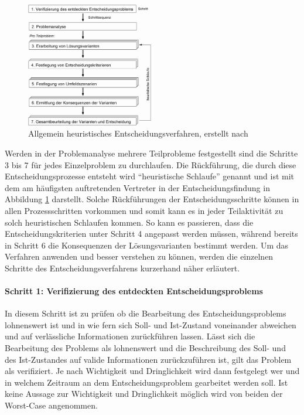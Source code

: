 \begin{figure}[h!]
	\centering
	\includegraphics[width=0.5\textwidth]{img/heuristik}
	\caption{Allgemein heuristisches Entscheidungsverfahren, erstellt nach \cite{Grunig.2013}}
	\label{fig:ahev}
\end{figure}
\FloatBarrier

Werden in der Problemanalyse mehrere Teilprobleme festgestellt sind die Schritte\,3 bis 7 für jedes Einzelproblem zu durchlaufen. Die Rückführung, die durch diese Entscheidungsprozesse entsteht wird "`heuristische Schlaufe"' genannt und ist mit dem am häufigsten auftretenden Vertreter in der Entscheidungsfindung in Abbildung \ref{fig:ahev} darstellt. Solche Rückführungen der Entscheidungsschritte können in allen Prozessschritten vorkommen und somit kann es in jeder Teilaktivität zu solch heuristischen Schlaufen kommen. So kann es passieren, dass die Entscheidungskriterien unter Schritt 4 angepasst werden müssen, während bereits in Schritt 6 die Konsequenzen der Lösungsvarianten bestimmt werden. \cite{Grunig.2013}\linebreak
Um das Verfahren anwenden und besser verstehen zu können, werden die einzelnen Schritte des Entscheidungsverfahrens kurzerhand näher erläutert. 
\paragraph{Schritt 1: Verifizierung des entdeckten Entscheidungsproblems} In diesem Schritt ist zu prüfen ob die Bearbeitung des Entscheidungsproblems lohnenswert ist und in wie fern sich Soll- und Ist-Zustand voneinander abweichen und auf verlässliche Informationen zurückführen lassen. Lässt sich die Bearbeitung des Problems als lohnenswert und die Beschreibung des Soll- und des Ist-Zustandes auf valide Informationen zurückzuführen ist, gilt das Problem als verifiziert. Je nach Wichtigkeit und Dringlichkeit wird dann festgelegt wer und in welchem Zeitraum an dem Entscheidungsproblem gearbeitet werden soll. Ist keine Aussage zur Wichtigkeit und Dringlichkeit möglich wird von beiden der Worst-Case angenommen.


